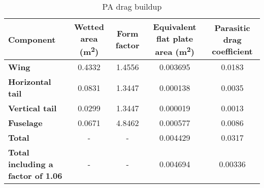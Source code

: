 \begin{table}[H]
\centering
    \begin{tabular}{@{}p{3cm}cccc@{}}
    \toprule
    \textbf{Component}       & \textbf{Wetted area (\si{\meter\squared})} & \textbf{Form factor} & \textbf{Equivalent flat plate area (\si{\meter\squared})} & \textbf{Parasitic drag coefficient} \\ \midrule
    
    \textbf{Wing}            & 0.4332               & 1.4556                 & 0.003695                                     & 0.0183                                \\
    
    \textbf{Horizontal tail} & 0.0831                    & 1.3447                 & 0.000138                                     & 0.0035                                  \\
    
    \textbf{Vertical tail}   & 0.0299                    & 1.3447                & 0.000019                                     & 0.0013                                 \\
    
    \textbf{Fuselage}        &    0.0671                  & 4.8462                   &   0.000577                                     &      0.0086                              \\
    \textbf{Total}    & -                    & -                    & 0.004429                                    & 0.0317                                 \\
    \textbf{Total including a factor of 1.06}    & -                    & -               & 0.004694                                          & 0.00336                                 \\
    \bottomrule
    \end{tabular}
\caption{PA drag buildup}
\label{tab:pa_drag_polar}
\end{table}